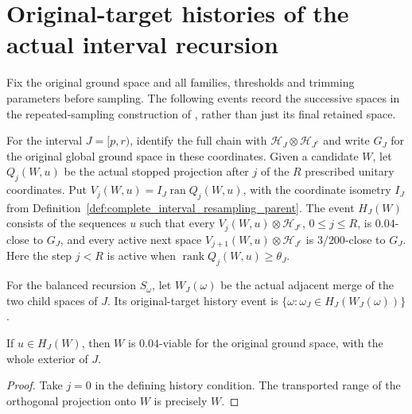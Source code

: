 \section{Original-target histories of the actual interval recursion}

Fix the original ground space and all families, thresholds and trimming
parameters before sampling. The following events record the successive
spaces in the repeated-sampling construction of
\cite{Arad2016RigorousRG}, rather than just its final retained space.

\begin{definition}
    \label{def:interval_original_target_history}
    \leanok
    For the interval $J=[p,r)$, identify the full chain with
    $\mathcal H_J\otimes\mathcal H_{J^c}$ and write $G_J$ for the original
    global ground space in these coordinates. Given a candidate $W$, let
    $Q_j(W,u)$ be the actual stopped projection after $j$ of the $R$
    prescribed unitary coordinates. Put
    $V_j(W,u)=I_J\operatorname{ran}Q_j(W,u)$, with the coordinate isometry
    $I_J$ from Definition~\ref{def:complete_interval_resampling_parent}.
    The event $H_J(W)$ consists of the sequences $u$ such that every
    $V_j(W,u)\otimes\mathcal H_{J^c}$, $0\le j\le R$, is $0.04$-close to
    $G_J$, and every active next space
    $V_{j+1}(W,u)\otimes\mathcal H_{J^c}$ is $3/200$-close to $G_J$.
    Here the step $j<R$ is active when
    $\operatorname{rank}Q_j(W,u)\ge\theta_J$.

    For the balanced recursion $S_\omega$, let $W_J(\omega)$ be the actual
    adjacent merge of the two child spaces of $J$. Its original-target
    history event is $\{\omega:\omega_J\in H_J(W_J(\omega))\}$.
\end{definition}

\begin{lemma}
    \label{lem:interval_history_initial_viability}
    \leanok
    If $u\in H_J(W)$, then $W$ is $0.04$-viable for the original
    ground space, with the whole exterior of $J$.
\end{lemma}
\begin{proof}\leanok
    Take $j=0$ in the defining history condition. The transported range
    of the orthogonal projection onto $W$ is precisely $W$.
\end{proof}

